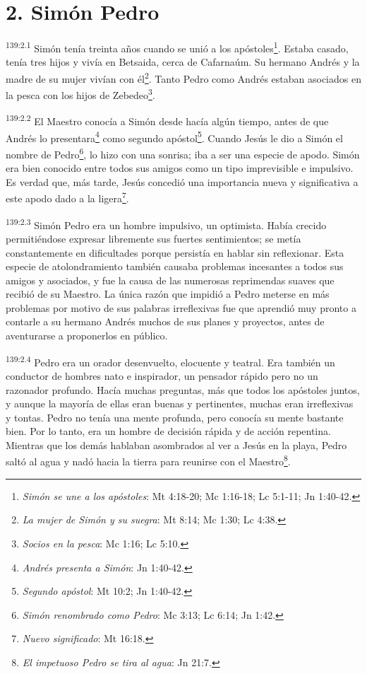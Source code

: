 \section*{2. Simón Pedro}
\par 
\textsuperscript{139:2.1} Simón tenía treinta años cuando se unió a los apóstoles\footnote{\textit{Simón se une a los apóstoles}: Mt 4:18-20; Mc 1:16-18; Lc 5:1-11; Jn 1:40-42.}. Estaba casado, tenía tres hijos y vivía en Betsaida, cerca de Cafarnaúm. Su hermano Andrés y la madre de su mujer vivían con él\footnote{\textit{La mujer de Simón y su suegra}: Mt 8:14; Mc 1:30; Lc 4:38.}. Tanto Pedro como Andrés estaban asociados en la pesca con los hijos de Zebedeo\footnote{\textit{Socios en la pesca}: Mc 1:16; Lc 5:10.}.

\par 
\textsuperscript{139:2.2} El Maestro conocía a Simón desde hacía algún tiempo, antes de que Andrés lo presentara\footnote{\textit{Andrés presenta a Simón}: Jn 1:40-42.} como segundo apóstol\footnote{\textit{Segundo apóstol}: Mt 10:2; Jn 1:40-42.}. Cuando Jesús le dio a Simón el nombre de Pedro\footnote{\textit{Simón renombrado como Pedro}: Mc 3:13; Lc 6:14; Jn 1:42.}, lo hizo con una sonrisa; iba a ser una especie de apodo. Simón era bien conocido entre todos sus amigos como un tipo imprevisible e impulsivo. Es verdad que, más tarde, Jesús concedió una importancia nueva y significativa a este apodo dado a la ligera\footnote{\textit{Nuevo significado}: Mt 16:18.}.

\par 
\textsuperscript{139:2.3} Simón Pedro era un hombre impulsivo, un optimista. Había crecido permitiéndose expresar libremente sus fuertes sentimientos; se metía constantemente en dificultades porque persistía en hablar sin reflexionar. Esta especie de atolondramiento también causaba problemas incesantes a todos sus amigos y asociados, y fue la causa de las numerosas reprimendas suaves que recibió de su Maestro. La única razón que impidió a Pedro meterse en más problemas por motivo de sus palabras irreflexivas fue que aprendió muy pronto a contarle a su hermano Andrés muchos de sus planes y proyectos, antes de aventurarse a proponerlos en público.

\par 
\textsuperscript{139:2.4} Pedro era un orador desenvuelto, elocuente y teatral. Era también un conductor de hombres nato e inspirador, un pensador rápido pero no un razonador profundo. Hacía muchas preguntas, más que todos los apóstoles juntos, y aunque la mayoría de ellas eran buenas y pertinentes, muchas eran irreflexivas y tontas. Pedro no tenía una mente profunda, pero conocía su mente bastante bien. Por lo tanto, era un hombre de decisión rápida y de acción repentina. Mientras que los demás hablaban asombrados al ver a Jesús en la playa, Pedro saltó al agua y nadó hacia la tierra para reunirse con el Maestro\footnote{\textit{El impetuoso Pedro se tira al agua}: Jn 21:7.}.


